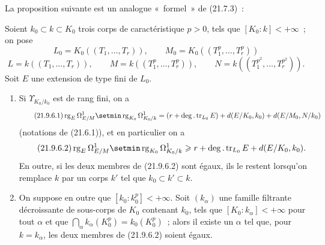 La proposition suivante est un analogue «~formel~» de (21.7.3)~:

\begin{proposition}[21.9.6]
\label{0.21.9.6-fr}
Soient $k_0\subset k\subset K_0$ trois corps de caractéristique $p>0$, tels
que $[K_0:k]<+\infty$~; on pose
\[
  L_0=K_0((T_1,\ldots,T_r)),\qquad
  M_0=K_0((T_1^p,\ldots,T_r^p))
\]
\[
  L=k((T_1,\ldots,T_r)),\qquad
  M=k((T_1^p,\ldots,T_r^p)),\qquad
  N=k((T_1^{p^2},\ldots,T_r^{p^2})).
\]
Soit $E$ une extension de type fini de $L_0$.
\begin{enumerate}
  \item[\textup{(i)}] Si $\Upsilon_{K_0/k_0}$ est de rang fini, on a
  \begin{equation}
  \tag{21.9.6.1}
  \label{0.21.9.6.1-fr}
    \operatorname{rg}_E\Omega^1_{E/M}
    \setmin\operatorname{rg}_{K_0}\Omega^1_{K_0/k}
    =(r+\deg.\operatorname{tr}_{L_0}E)
      +d(E/K_0,k_0)+d(E/M_0,N/k_0)
  \end{equation}
  (notations de (21.6.1)), et en particulier on a
  \begin{equation}
  \tag{21.9.6.2}
  \label{0.21.9.6.2-fr}
    \operatorname{rg}_E\Omega^1_{E/M}
    \setmin\operatorname{rg}_{K_0}\Omega^1_{K_0/k}
    \geqslant r+\deg.\operatorname{tr}_{L_0}E+d(E/K_0,k_0).
  \end{equation}
  En outre, si les deux membres de (21.9.6.2) sont égaux, ils le restent
  lorsqu'on remplace $k$ par un corps $k'$ tel que $k_0\subset k'\subset k$.

  \item[\textup{(ii)}] On suppose en outre que $[k_0:k_0^p]<+\infty$. Soit
  $(k_\alpha)$ une famille filtrante décroissante de sous-corps de $K_0$
  contenant $k_0$, tels que $[K_0:k_\alpha]<+\infty$ pour tout $\alpha$ et
  que
  $\bigcap_\alpha k_\alpha(K_0^p)=k_0(K_0^p)$~; alors il existe un $\alpha$
  tel que, pour $k=k_\alpha$, les deux membres de (21.9.6.2) soient égaux.
\end{enumerate}
\end{proposition}

